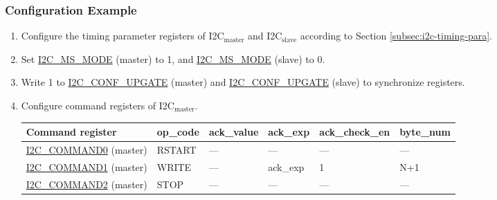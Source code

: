 \documentclass[main\_\_EN.tex]{subfiles}
\begin{document}
\subsubsection{Configuration Example}
\begin{enumerate}
\item Configure the timing parameter registers of I2C$_\text{master}$ and I2C$_\text{slave}$ according to Section \ref{subsec:i2c-timing-para}.
\item Set \hyperref[fielddesc:I2CMSMODE]{I2C\_MS\_MODE} (master) to 1, and \hyperref[fielddesc:I2CMSMODE]{I2C\_MS\_MODE} (slave) to 0.
\item Write 1 to \hyperref[fielddesc:I2CCONFUPGATE]{I2C\_CONF\_UPGATE} (master) and \hyperref[fielddesc:I2CCONFUPGATE]{I2C\_CONF\_UPGATE} (slave) to synchronize registers.
\item Configure command registers of I2C$_\text{master}$.

\vspace{2em}
\begin{longtable}{ | p{4.5cm} | p{1.8cm} | p{1.8cm} | p{1.8cm} |p{2.2cm} | p{1.8cm}|}
\hline\rowcolor{lightgray}
Command register& op\_code & ack\_value&ack\_exp&ack\_check\_en&byte\_num  \\ \hline
\hyperref[fielddesc:I2CCOMMAND0]{I2C\_COMMAND0} (master)& RSTART& ---&---&---&---  \\ \hline
\hyperref[fielddesc:I2CCOMMAND1]{I2C\_COMMAND1} (master)& WRITE& ---&ack\_exp&1&N+1  \\ \hline
\hyperref[fielddesc:I2CCOMMAND2]{I2C\_COMMAND2} (master)& STOP& ---&---&---&---  \\ \hline
\end{longtable}


\end{enumerate}
\end{document}
